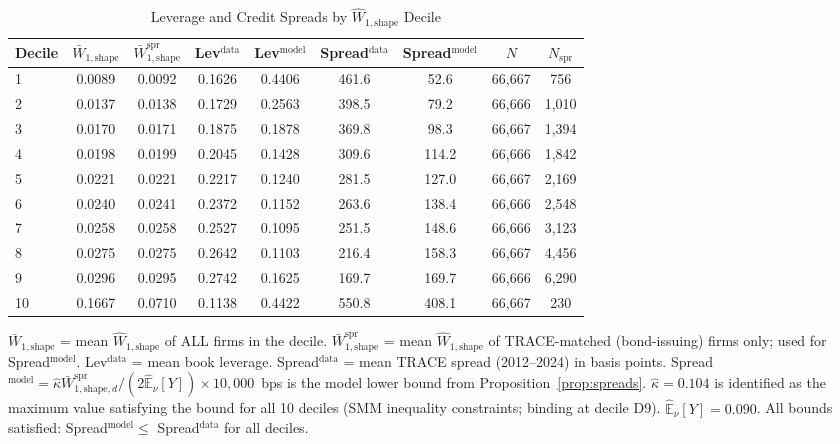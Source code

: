 \begin{table}[htbp]
\centering
\caption{Leverage and Credit Spreads by $\widehat{W}_{1,\text{shape}}$ Decile}
\label{tab:decile_fit}
\begin{threeparttable}
\begin{tabular}{lcccccccc}
\toprule
Decile & $\bar{W}_{1,\text{shape}}$ & $\bar{W}_{1,\text{shape}}^{\text{spr}}$ & Lev$^{\text{data}}$ & Lev$^{\text{model}}$ & Spread$^{\text{data}}$ & Spread$^{\text{model}}$ & $N$ & $N_{\text{spr}}$ \\
\midrule
1 & 0.0089 & 0.0092 & 0.1626 & 0.4406 & 461.6 & 52.6 & 66,667 & 756 \\
2 & 0.0137 & 0.0138 & 0.1729 & 0.2563 & 398.5 & 79.2 & 66,666 & 1,010 \\
3 & 0.0170 & 0.0171 & 0.1875 & 0.1878 & 369.8 & 98.3 & 66,667 & 1,394 \\
4 & 0.0198 & 0.0199 & 0.2045 & 0.1428 & 309.6 & 114.2 & 66,666 & 1,842 \\
5 & 0.0221 & 0.0221 & 0.2217 & 0.1240 & 281.5 & 127.0 & 66,667 & 2,169 \\
6 & 0.0240 & 0.0241 & 0.2372 & 0.1152 & 263.6 & 138.4 & 66,666 & 2,548 \\
7 & 0.0258 & 0.0258 & 0.2527 & 0.1095 & 251.5 & 148.6 & 66,666 & 3,123 \\
8 & 0.0275 & 0.0275 & 0.2642 & 0.1103 & 216.4 & 158.3 & 66,667 & 4,456 \\
9 & 0.0296 & 0.0295 & 0.2742 & 0.1625 & 169.7 & 169.7 & 66,666 & 6,290 \\
10 & 0.1667 & 0.0710 & 0.1138 & 0.4422 & 550.8 & 408.1 & 66,667 & 230 \\
\bottomrule
\end{tabular}
\begin{tablenotes}
\small
\item $\bar{W}_{1,\text{shape}}$ = mean $\widehat{W}_{1,\text{shape}}$ of ALL firms in the decile. $\bar{W}_{1,\text{shape}}^{\text{spr}}$ = mean $\widehat{W}_{1,\text{shape}}$ of TRACE-matched (bond-issuing) firms only; used for Spread$^{\text{model}}$. Lev$^{\text{data}}$ = mean book leverage. Spread$^{\text{data}}$ = mean TRACE spread (2012--2024) in basis points. Spread$^{\text{model}} = \hat{\kappa}\bar{W}_{1,\text{shape},d}^{\text{spr}}/(2\hat{\mathbb{E}}_\nu[Y])\times 10{,}000$~bps is the model lower bound from Proposition~\ref{prop:spreads}. $\hat{\kappa} = 0.104$ is identified as the maximum value satisfying the bound for all 10 deciles (SMM inequality constraints; binding at decile D9). $\hat{\mathbb{E}}_\nu[Y] = 0.090$. All bounds satisfied: Spread$^{\text{model}} \leq$ Spread$^{\text{data}}$ for all deciles.
\end{tablenotes}
\end{threeparttable}
\end{table}